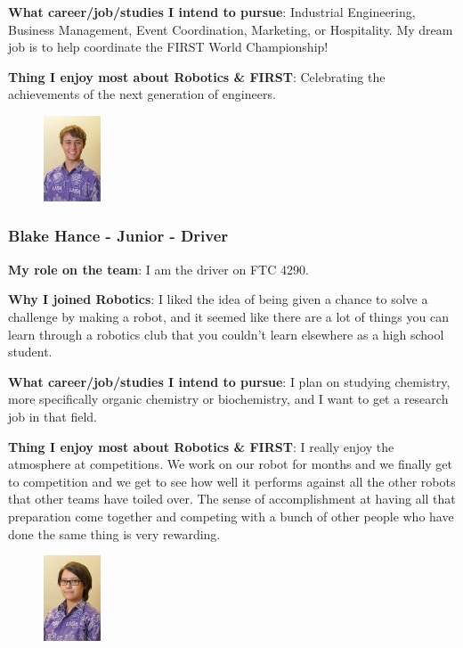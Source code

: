 {\bf What career/job/studies I intend to pursue}: Industrial Engineering, Business Management, Event Coordination, Marketing, or Hospitality. My dream job is to help coordinate the FIRST World Championship! 

{\bf Thing I enjoy most about Robotics \& FIRST}: Celebrating the achievements of the next generation of engineers.

\begin{figure}
	\centering
	\includegraphics[height=1in]{blake}
\end{figure}
\subsubsection{Blake Hance - Junior - Driver} 
{\bf My role on the team}: I am the driver on FTC 4290.

{\bf Why I joined Robotics}: I liked the idea of being given a chance to solve a challenge by making a robot, and it seemed like there are a lot of things you can learn through a robotics club that you couldn't learn elsewhere as a high school student.

{\bf What career/job/studies I intend to pursue}: I plan on studying chemistry, more specifically organic chemistry or biochemistry, and I want to get a research job in that field.

{\bf Thing I enjoy most about Robotics \& FIRST}: I really enjoy the atmosphere at competitions. We work on our robot for months and we finally get to competition and we get to see how well it performs against all the other robots that other teams have toiled over. The sense of accomplishment at having all that preparation come together and competing with a bunch of other people who have done the same thing is very rewarding.

\begin{figure}
	\centering
	\includegraphics[height=1in]{kyla}
\end{figure}
